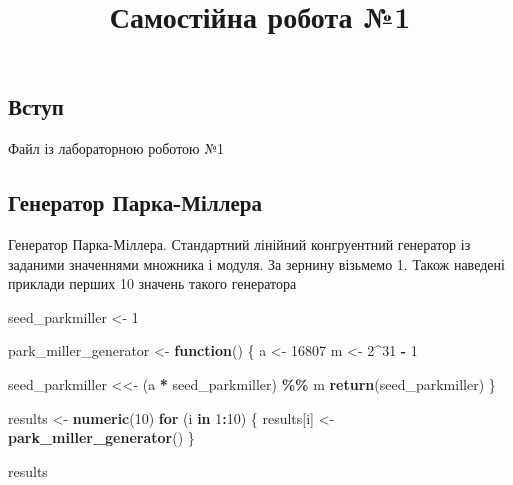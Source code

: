 \documentclass[
]{article}
\title{Самостійна робота №1}
\author{}
\date{\vspace{-2.5em}}
\newenvironment{Shaded}{\begin{snugshade}}{\end{snugshade}}
\newcommand{\ControlFlowTok}[1]{\textcolor[rgb]{0.13,0.29,0.53}{\textbf{#1}}}
\newcommand{\DecValTok}[1]{\textcolor[rgb]{0.00,0.00,0.81}{#1}}
\newcommand{\FunctionTok}[1]{\textcolor[rgb]{0.13,0.29,0.53}{\textbf{#1}}}
\newcommand{\NormalTok}[1]{#1}
\newcommand{\OtherTok}[1]{\textcolor[rgb]{0.56,0.35,0.01}{#1}}
\newcommand{\SpecialCharTok}[1]{\textcolor[rgb]{0.81,0.36,0.00}{\textbf{#1}}}
\begin{document}
\maketitle

\hypertarget{ux432ux441ux442ux443ux43f}{%
\subsection{Вступ}\label{ux432ux441ux442ux443ux43f}}

Файл із лабораторною роботою №1

\hypertarget{ux433ux435ux43dux435ux440ux430ux442ux43eux440-ux43fux430ux440ux43aux430-ux43cux456ux43bux43bux435ux440ux430}{%
\subsection{Генератор
Парка-Міллера}\label{ux433ux435ux43dux435ux440ux430ux442ux43eux440-ux43fux430ux440ux43aux430-ux43cux456ux43bux43bux435ux440ux430}}

Генератор Парка-Міллера. Стандартний лінійний конгруентний генератор із
заданими значеннями множника і модуля. За зернину візьмемо 1. Також
наведені приклади перших 10 значень такого генератора

\begin{Shaded}
\begin{Highlighting}[]
\NormalTok{seed\_parkmiller }\OtherTok{\textless{}{-}} \DecValTok{1}

\NormalTok{park\_miller\_generator }\OtherTok{\textless{}{-}} \ControlFlowTok{function}\NormalTok{() \{}
\NormalTok{  a }\OtherTok{\textless{}{-}} \DecValTok{16807}
\NormalTok{  m }\OtherTok{\textless{}{-}} \DecValTok{2}\SpecialCharTok{\^{}}\DecValTok{31} \SpecialCharTok{{-}} \DecValTok{1}
  
\NormalTok{  seed\_parkmiller }\OtherTok{\textless{}\textless{}{-}}\NormalTok{ (a }\SpecialCharTok{*}\NormalTok{ seed\_parkmiller) }\SpecialCharTok{\%\%}\NormalTok{ m}
  \FunctionTok{return}\NormalTok{(seed\_parkmiller)}
\NormalTok{\}}

\NormalTok{results }\OtherTok{\textless{}{-}} \FunctionTok{numeric}\NormalTok{(}\DecValTok{10}\NormalTok{)}
\ControlFlowTok{for}\NormalTok{ (i }\ControlFlowTok{in} \DecValTok{1}\SpecialCharTok{:}\DecValTok{10}\NormalTok{) \{}
\NormalTok{  results[i] }\OtherTok{\textless{}{-}} \FunctionTok{park\_miller\_generator}\NormalTok{()}
\NormalTok{\}}

\NormalTok{results}
\end{Highlighting}
\end{Shaded}
\end{document}
